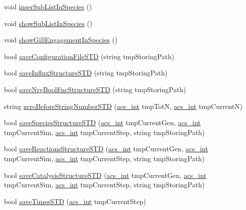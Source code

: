 \begin{DoxyCompactItemize}
\item 
void \hyperlink{a00013_af293fafca4582120d88f888d70d8623a}{inser\+Sub\+List\+In\+Species} ()
\item 
void \hyperlink{a00013_a5cb194f927ddc7a804a942ca71f062af}{show\+Sub\+List\+In\+Species} ()
\item 
void \hyperlink{a00013_aef1d3687767151218f3b7379dc230430}{show\+Gill\+Engagement\+In\+Species} ()
\item 
bool \hyperlink{a00013_a71f4c5ff1c11a9d61cbc818682a4a91e}{save\+Configuration\+File\+S\+T\+D} (string tmp\+Storing\+Path)
\item 
bool \hyperlink{a00013_a8f831e2db11fa5d840484345dac64fc7}{save\+Influx\+Structure\+S\+T\+D} (string tmp\+Storing\+Path)
\item 
bool \hyperlink{a00013_a1412b9b1c3bd3e42bcb481f5e18ea931}{save\+Nrg\+Bool\+Fnc\+Structure\+S\+T\+D} (string tmp\+Storing\+Path)
\item 
string \hyperlink{a00013_a8699a0f85f5e8dc23eb8f78fa22c6b17}{zero\+Before\+String\+Number\+S\+T\+D} (\hyperlink{a00050_a8d277355641a098190360234e2ebde35}{acs\+\_\+int} tmp\+Tot\+N, \hyperlink{a00050_a8d277355641a098190360234e2ebde35}{acs\+\_\+int} tmp\+Current\+N)
\item 
bool \hyperlink{a00013_a9daeb4f255100b8ad59de9ea80b19b5b}{save\+Species\+Structure\+S\+T\+D} (\hyperlink{a00050_a8d277355641a098190360234e2ebde35}{acs\+\_\+int} tmp\+Current\+Gen, \hyperlink{a00050_a8d277355641a098190360234e2ebde35}{acs\+\_\+int} tmp\+Current\+Sim, \hyperlink{a00050_a8d277355641a098190360234e2ebde35}{acs\+\_\+int} tmp\+Current\+Step, string tmp\+Storing\+Path)
\item 
bool \hyperlink{a00013_ad381c4ce24045d504539bb7c74800739}{save\+Reactions\+Structure\+S\+T\+D} (\hyperlink{a00050_a8d277355641a098190360234e2ebde35}{acs\+\_\+int} tmp\+Current\+Gen, \hyperlink{a00050_a8d277355641a098190360234e2ebde35}{acs\+\_\+int} tmp\+Current\+Sim, \hyperlink{a00050_a8d277355641a098190360234e2ebde35}{acs\+\_\+int} tmp\+Current\+Step, string tmp\+Storing\+Path)
\item 
bool \hyperlink{a00013_a0a799b3a42bd90845a915298e184708c}{save\+Catalysis\+Structure\+S\+T\+D} (\hyperlink{a00050_a8d277355641a098190360234e2ebde35}{acs\+\_\+int} tmp\+Current\+Gen, \hyperlink{a00050_a8d277355641a098190360234e2ebde35}{acs\+\_\+int} tmp\+Current\+Sim, \hyperlink{a00050_a8d277355641a098190360234e2ebde35}{acs\+\_\+int} tmp\+Current\+Step, string tmp\+Storing\+Path)
\item 
bool \hyperlink{a00013_af8083321a2bc93f4f613b05d74d37833}{save\+Times\+S\+T\+D} (\hyperlink{a00050_a8d277355641a098190360234e2ebde35}{acs\+\_\+int} tmp\+Current\+Step)

\end{DoxyCompactItemize}
